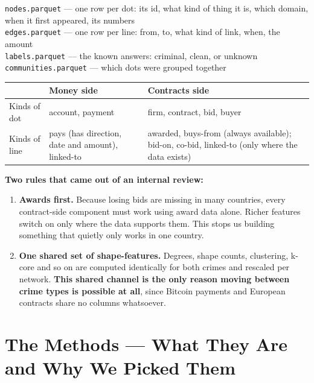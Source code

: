 \documentclass[11pt,a4paper]{article}
\newcommand{\code}[1]{\texttt{\small #1}}
\begin{document}
\begin{plain}
\code{nodes.parquet} --- one row per dot: its id, what kind of thing it is, which
domain, when it first appeared, its numbers\\
\code{edges.parquet} --- one row per line: from, to, what kind of link, when, the
amount\\
\code{labels.parquet} --- the known answers: criminal, clean, or unknown\\
\code{communities.parquet} --- which dots were grouped together
\end{plain}

\begin{longtable}{@{}p{3.2cm}p{5.9cm}p{5.9cm}@{}}
\toprule
 & \textbf{Money side} & \textbf{Contracts side} \\
\midrule
\endhead
Kinds of dot & account, payment & firm, contract, bid, buyer \\
Kinds of line & pays (has direction, date and amount), linked-to &
awarded, buys-from (always available); bid-on, co-bid, linked-to (only where the
data exists) \\
\bottomrule
\end{longtable}

\textbf{Two rules that came out of an internal review:}

\begin{enumerate}
  \item \textbf{Awards first.} Because losing bids are missing in many countries,
        every contract-side component must work using award data alone. Richer
        features switch on only where the data supports them. This stops us
        building something that quietly only works in one country.
  \item \textbf{One shared set of shape-features.} Degrees, shape counts,
        clustering, k-core and so on are computed identically for both crimes and
        rescaled per network. \textbf{This shared channel is the only reason
        moving between crime types is possible at all}, since Bitcoin payments
        and European contracts share no columns whatsoever.
\end{enumerate}

\section{The Methods --- What They Are and Why We Picked Them}
\label{sec:algos}
\end{document}
